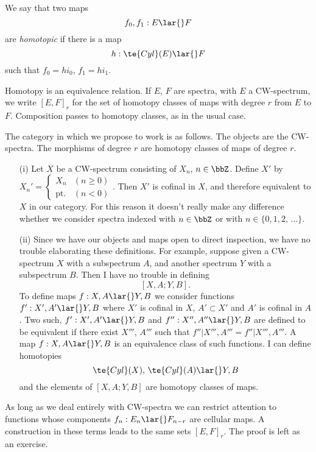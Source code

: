 \documentclass[../main]{subfiles}
\begin{document}
We say that two maps
\[
f_0,f_1: E\lar{} F
\]
are \emph{homotopic} if there is a map
\[
h: \te{Cyl}(E) \lar{} F
\]
such that $f_0=hi_0$, $f_1=hi_1$.

Homotopy is an equivalence relation. If $E$, $F$ are spectra, with $E$ a CW-spectrum, we write $[E,F]_r$ for the set of homotopy classes of maps with degree $r$ from $E$ to $F$. Composition passes to homotopy classes, as in the usual case.

The category in which we propose to work is as follows. The objects are the CW-spectra. The morphisms of degree $r$ are homotopy classes of maps of degree $r$.

\begin{notes}
    \begin{enumerate}
    \item[(i)]  Let $X$ be a CW-spectrum consisting of $X_n$, $n\in \bbZ$. Define $X'$ by $
    X_n' =
    \begin{cases}
    X_n          &(n\geq 0) \\
    \mathrm{pt.} &(n<0)
    \end{cases}
    $. Then $X'$ is cofinal in $X$, and therefore equivalent to $X$ in our category. For this reason it doesn't really make any difference whether we consider spectra indexed with $n\in\bbZ$ or with $n\in\{0,1,2,\, \hdots\}$.
    \item[(ii)] Since we have our objects and maps open to direct inspection, we have no trouble elaborating these definitions. For example, suppose given a CW-spectrum $X$ with a subspectrum $A$, and another spectrum $Y$ with a subspectrum $B$. Then I have no trouble in defining
    \[
    [X,A;Y,B].
    \]
    To define maps $f: X,A\lar{} Y,B$ we consider functions $f': X',A'\lar{} Y,B$ where $X'$ is cofinal in $X$, $A'\subset X'$ and $A'$ is cofinal in $A$. Two such, $f': X',A'\lar{} Y,B$ and $f'': X'',A''\lar{} Y,B$ are defined to be equivalent if there exist $X'''$, $A'''$ such that $\left. f'' \right\rvert X''',A'''=\left. f''\right\rvert X''',A'''$. A map $f: X,A\lar{} Y,B$ is an equivalence class of such functions. I can define homotopies
    \[
    \te{Cyl}(X),\, \te{Cyl}(A) \lar{} Y,B
    \]
    and the elements of $[X,A;Y,B]$ are homotopy classes of maps.
    \end{enumerate}
\end{notes}

As long as we deal entirely with CW-spectra we can restrict attention to functions whose components $f_n:E_n\lar{} F_{n-r}$ are cellular maps. A construction in these terms leads to the same sets $[E,F]_r$. The proof is left as an exercise.
\end{document}
